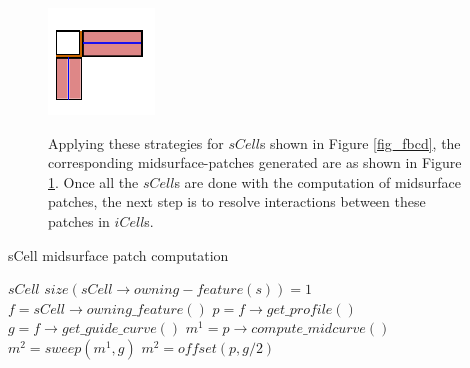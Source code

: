 \begin{figure}[h]
\centering 
\begin{minipage}[h]{0.4\linewidth} 
\centering \includegraphics[width=0.65\linewidth]{../Common/images/MidsurfPatches.pdf}
\label{fig_scells}
\end{minipage}
\begin{minipage}[h]{0.55\linewidth} 
Applying these strategies for $sCell$s shown in Figure \ref{fig_fbcd}, the corresponding midsurface-patches generated are as shown in Figure \ref{fig_scells}.  Once all the $sCell$s are done with the computation of midsurface patches, the next step is to resolve interactions  between these patches in $iCell$s.
\end{minipage}
\end{figure}

\bigskip

	\begin{algorithm}[!h]
		\caption{sCell midsurface patch computation}
		\label{alg_MidsurfsCell}
		\begin{algorithmic}
			\REQUIRE $sCell$
			\ENSURE $size(sCell \rightarrow owning-feature(s)) = 1$
			\STATE $f = sCell \rightarrow owning\_feature()$
			\STATE $p = f \rightarrow get\_profile()$
			\STATE $g = f \rightarrow get\_guide\_curve()$
				\STATE $m^1 = p\rightarrow compute\_midcurve()$
				\STATE $m^2 = sweep(m^1 ,g)$
			\ELSE
				\STATE $m^2 = offset(p ,g/2)$
			\ENDIF
		\end{algorithmic}
	\end{algorithm}
	
